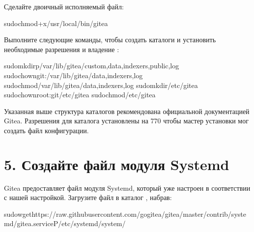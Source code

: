 \documentclass[letterpaper,10pt,russian]{sphinxmanual}
\begin{document}
\sphinxAtStartPar
Сделайте двоичный исполняемый файл:

\begin{sphinxVerbatim}[commandchars=\\\{\}]
\PYGZdl{}sudochmod+x/usr/local/bin/gitea
\end{sphinxVerbatim}

\sphinxAtStartPar
Выполните следующие команды, чтобы создать каталоги и установить необходимые разрешения и владение :

\begin{sphinxVerbatim}[commandchars=\\\{\}]
\PYGZdl{}sudomkdir\PYGZhy{}p/var/lib/gitea/custom,data,indexers,public,log
\PYGZdl{}sudochowngit:/var/lib/gitea/data,indexers,log
\PYGZdl{}sudochmod/var/lib/gitea/data,indexers,log
\PYGZdl{}sudomkdir/etc/gitea
\PYGZdl{}sudochownroot:git/etc/gitea
\PYGZdl{}sudochmod/etc/gitea
\end{sphinxVerbatim}

\sphinxAtStartPar
Указанная выше структура каталогов рекомендована официальной документацией Gitea.
Разрешения для каталога  установлены на 770 чтобы мастер установки мог создать файл конфигурации.


\section{5. Создайте файл модуля Systemd}
\label{\detokenize{git:systemd}}
\sphinxAtStartPar
Gitea предоставляет файл модуля Systemd, который уже настроен в соответствии с нашей настройкой.
Загрузите файл в каталог  , набрав:

\begin{sphinxVerbatim}[commandchars=\\\{\}]
\PYGZdl{}sudowgethttps://raw.githubusercontent.com/go\PYGZhy{}gitea/gitea/master/contrib/systemd/gitea.service\PYGZhy{}P/etc/systemd/system/
\end{sphinxVerbatim}
\end{document}
